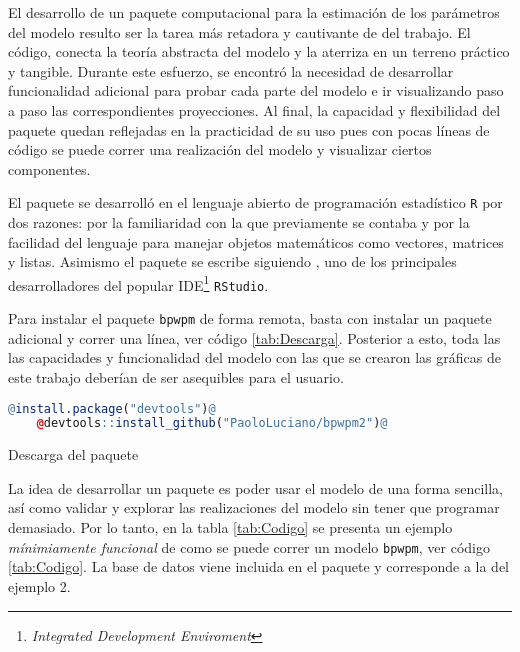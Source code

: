 \documentclass[../../Main/Main.tex]{subfiles}
\begin{document}
El desarrollo de un paquete computacional para la estimación de los parámetros del modelo resulto ser la tarea más retadora y cautivante de del trabajo. El código, conecta la teoría abstracta del modelo y la aterriza en un terreno práctico y tangible. Durante este esfuerzo, se encontró la necesidad de desarrollar funcionalidad adicional para probar cada parte del modelo e ir visualizando paso a paso las correspondientes proyecciones. Al final, la capacidad y flexibilidad del paquete quedan reflejadas en la practicidad de su uso pues con pocas líneas de código se puede correr una realización del modelo y visualizar ciertos componentes.

El paquete se desarrolló en el lenguaje abierto de programación estadístico \verb|R| por dos razones: por la familiaridad con la que previamente se contaba y por la facilidad del lenguaje para manejar objetos matemáticos como vectores, matrices y listas.  Asimismo el paquete se escribe siguiendo \citet{wickham2015rpck}, uno de los principales desarrolladores del popular IDE\footnote{\emph{Integrated Development Enviroment}} \verb|RStudio|. 

Para instalar el paquete \verb|bpwpm| de forma remota, basta con instalar un paquete adicional y correr una línea, ver código \ref{tab:Descarga}. Posterior a esto, toda las las capacidades y funcionalidad del modelo con las que se crearon las gráficas de este trabajo deberían de ser asequibles para el usuario.

\begin{table}[h]
\makebox[\linewidth]{\rule{\textwidth}{0.4pt}}
\begin{lstlisting}[language = R, style = base]
	@install.package("devtools")@
	@devtools::install_github("PaoloLuciano/bpwpm2")@
\end{lstlisting}
\makebox[\linewidth]{\rule{\textwidth}{0.4pt}}
\caption{Descarga del paquete}
\label{tab:Descarga}
\end{table}

La idea de desarrollar un paquete es poder usar el modelo de una forma sencilla, así como validar y explorar las realizaciones del modelo sin tener que programar demasiado. Por lo tanto, en la tabla \ref{tab:Codigo} se presenta un ejemplo \textit{mínimiamente funcional} de como se puede correr un modelo \verb|bpwpm|, ver código \ref{tab:Codigo}. La base de datos viene incluida en el paquete y corresponde a la del ejemplo 2.
\end{document}
